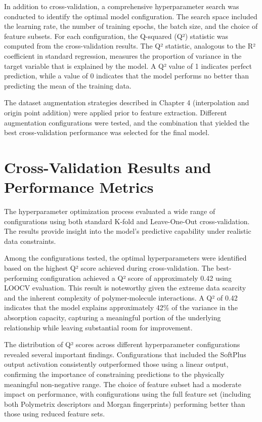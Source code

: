 In addition to cross-validation, a comprehensive hyperparameter search was conducted to identify the optimal model configuration. The search space included the learning rate, the number of training epochs, the batch size, and the choice of feature subsets. For each configuration, the Q-squared (Q²) statistic was computed from the cross-validation results. The Q² statistic, analogous to the R² coefficient in standard regression, measures the proportion of variance in the target variable that is explained by the model. A Q² value of 1 indicates perfect prediction, while a value of 0 indicates that the model performs no better than predicting the mean of the training data.

The dataset augmentation strategies described in Chapter 4 (interpolation and origin point addition) were applied prior to feature extraction. Different augmentation configurations were tested, and the combination that yielded the best cross-validation performance was selected for the final model.

\section{Cross-Validation Results and Performance Metrics}
\label{sec:cv_results}

The hyperparameter optimization process evaluated a wide range of configurations using both standard K-fold and Leave-One-Out cross-validation. The results provide insight into the model's predictive capability under realistic data constraints.

Among the configurations tested, the optimal hyperparameters were identified based on the highest Q² score achieved during cross-validation. The best-performing configuration achieved a Q² score of approximately 0.42 using LOOCV evaluation. This result is noteworthy given the extreme data scarcity and the inherent complexity of polymer-molecule interactions. A Q² of 0.42 indicates that the model explains approximately 42\% of the variance in the absorption capacity, capturing a meaningful portion of the underlying relationship while leaving substantial room for improvement.

The distribution of Q² scores across different hyperparameter configurations revealed several important findings. Configurations that included the SoftPlus output activation consistently outperformed those using a linear output, confirming the importance of constraining predictions to the physically meaningful non-negative range. The choice of feature subset had a moderate impact on performance, with configurations using the full feature set (including both Polymetrix descriptors and Morgan fingerprints) performing better than those using reduced feature sets.

